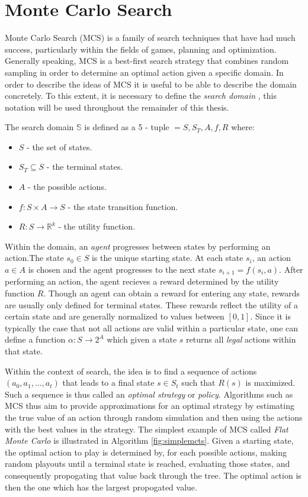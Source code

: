 \documentclass[master.tex]{subfiles}
\begin{document}
\section{Monte Carlo Search} 
Monte Carlo Search (MCS) is a family of search techniques that have had much success, particularly within the fields of games, planning and optimization. Generally speaking, MCS is a best-first search strategy that combines random sampling in order to determine an optimal action given a specific domain. In order to describe the ideas of MCS it is useful to be able to describe the domain concretely. To this extent, it is necessary to define the \emph{search domain} , this notation will be used throughout the remainder of this thesis. 

The search domain $\mathbb{S}$ is defined as a 5 - tuple $\mathbb = {S, S_T, A, f, R} $ where: 
\begin{itemize}
\item $S$ - the set of states. 
\item $S_T \subseteq S$ - the terminal states.
\item $A$ - the possible actions.
\item $f : S \times A \rightarrow S$ - the state transition function.
\item $R : S \rightarrow \mathbb{R}^{k} $ - the utility function.
\end{itemize}

Within the domain, an \emph{agent} progresses between states by performing an action.The state $s_0 \in S$ is the unique starting state. At each state $s_i$, an action $a \in A$ is chosen and the agent progresses to the next state $s_{i+1} = f(s_i, a)$. After performing an action, the agent recieves a reward determined by the utility function $R$. Though an agent can obtain a reward for entering any state, rewards are usually only defined for terminal states. These rewards reflect the utility of a certain state and are generally normalized to values between $[0, 1]$. Since it is typically the case that not all actions are valid within a particular state, one can define a function $\alpha : S \rightarrow 2^A$ which given a state $s$ returns all \emph{legal} actions within that state. 

Within the context of search, the idea is to find a sequence of actions $(a_0, a_1, \dots, a_t)$ that leads to a final state $s \in S_t$ such that $R(s)$ is maximized. Such a sequence is thus called an \emph{optimal strategy} or \emph{policy}.  Algorithms such as MCS thus aim to provide approximations for an optimal strategy by estimating the true value of an action through random simulation and then using the actions with the best values in the strategy. The simplest example of MCS called \emph{Flat Monte Carlo} is illustrated in Algorithm \ref{fig:simplemcts}. Given a starting state, the optimal action to play is determined by, for each possible actions, making random playouts until a terminal state is reached, evaluating those states, and  consequently propogating that value back through the tree. The optimal action is then the one which has the largest propogated value.   
\end{document}
